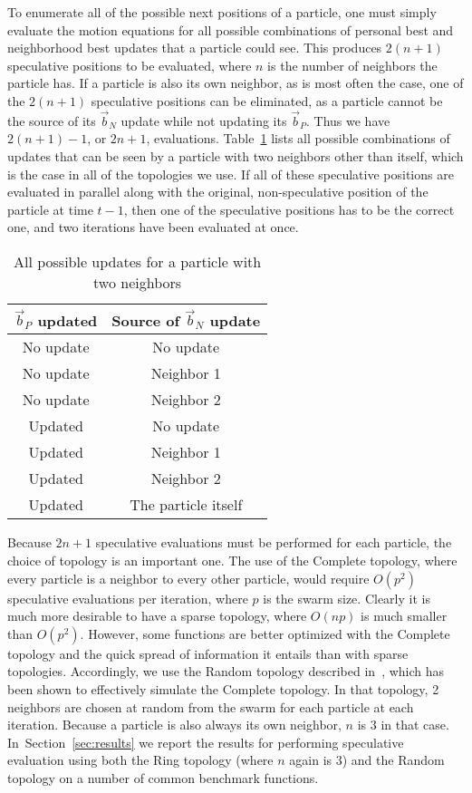 \documentclass[journal,letterpaper]{IEEEtran}
\renewcommand{\sec}[1]{Section~\ref{sec:#1}}
\providecommand{\nbest}{\ensuremath{\Vec{b}_N}}
\providecommand{\pbest}{\ensuremath{\Vec{b}_P}}
\begin{document}
To enumerate all of the possible next positions of a particle, one must simply
evaluate the motion equations for all possible combinations of personal best
and neighborhood best updates that a particle could see.  This produces
$2(n+1)$ speculative positions to be evaluated, where $n$ is the number of
neighbors the particle has.  If a particle is also its own neighbor, as is most
often the case, one of the $2(n+1)$ speculative positions can be eliminated, as
a particle cannot be the source of its $\nbest$ update while not updating its
$\pbest$.  Thus we have $2(n+1)-1$, or $2n+1$, evaluations.
Table~\ref{tab:evals} lists all possible combinations of updates that can be
seen by a particle with two neighbors other than itself, which is the case in
all of the topologies we use.  If all of these speculative positions are
evaluated in parallel along with the original, non-speculative position of the
particle at time $t-1$, then one of the speculative positions has to be the
correct one, and two iterations have been evaluated at once.

\begin{table}
  \caption{All possible updates for a particle with two neighbors}
  \label{tab:evals}
  \centering
  \begin{tabular}{cc}
	$\pbest$ updated&Source of $\nbest$ update\\
	\hline
	\hline
	No update&No update\\
	\hline
	No update&Neighbor 1\\
	\hline
	No update&Neighbor 2\\
	\hline
	Updated&No update\\
	\hline
	Updated&Neighbor 1\\
	\hline
	Updated&Neighbor 2\\
	\hline
	Updated&The particle itself\\
	\hline
  \end{tabular}
\end{table}

Because $2n+1$ speculative evaluations must be performed for each particle, the
choice of topology is an important one.  The use of the Complete topology,
where every particle is a neighbor to every other particle, would require
$O(p^2)$ speculative evaluations per iteration, where $p$ is the swarm size.
Clearly it is much more desirable to have a sparse topology, where $O(np)$ is
much smaller than $O(p^2)$.  However, some functions are better optimized with
the Complete topology and the quick spread of information it entails than with
sparse topologies.  Accordingly, we use the Random topology described
in~\cite{mcnabb-cec09}, which has been shown to effectively simulate the
Complete topology.  In that topology, 2 neighbors are chosen at random from the
swarm for each particle at each iteration.  Because a particle is also always
its own neighbor, $n$ is $3$ in that case.  In~\sec{results} we report the
results for performing speculative evaluation using both the Ring topology
(where $n$ again is $3$) and the Random topology on a number of common
benchmark functions.
\end{document}
